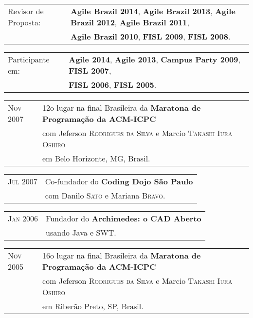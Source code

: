 \documentclass[letter,10pt]{article}
\begin{document}
\begin{tabular}{p{2.5cm}l}
  Revisor de Proposta: & \textbf{Agile Brazil 2014}, \textbf{Agile Brazil 2013}, \textbf{Agile Brazil 2012}, \textbf{Agile Brazil 2011},\\
  & \textbf{Agile Brazil 2010}, \textbf{FISL 2009}, \textbf{FISL 2008}.
\end{tabular}

\begin{tabular}{p{2.5cm}l}
  Participante em: & \textbf{Agile 2014}, \textbf{Agile 2013}, \textbf{Campus Party 2009}, \textbf{FISL 2007},\\
  & \textbf{FISL 2006}, \textbf{FISL 2005}.
\end{tabular}

\begin{tabular}{p{2.5cm}l}
  \textsc{Nov 2007} & 12o lugar na final Brasileira da
  \textbf{Maratona de Programação da ACM-ICPC}\\
  & com Jeferson \textsc{Rodrigues da Silva} e Marcio
  \textsc{Takashi Iura Oshiro}\\
  & em Belo Horizonte, MG, Brasil.\\
\end{tabular}

\begin{tabular}{p{2.5cm}l}
  \textsc{Jul 2007} & Co-fundador do \textbf{Coding Dojo São Paulo}\\
  & com Danilo \textsc{Sato} e Mariana \textsc{Bravo}.\\
\end{tabular}

\begin{tabular}{p{2.5cm}l}
  \textsc{Jan 2006} & Fundador do \textbf{Archimedes: o CAD Aberto}\\
  & usando Java e SWT.\\
\end{tabular}

\begin{tabular}{p{2.5cm}l}
  \textsc{Nov 2005} & 16o lugar na final Brasileira da
  \textbf{Maratona de Programação da ACM-ICPC}\\
  & com Jeferson \textsc{Rodrigues da Silva} e Marcio
  \textsc{Takashi Iura Oshiro}\\
  & em Riberão Preto, SP, Brasil.\\
\end{tabular}
\end{document}
